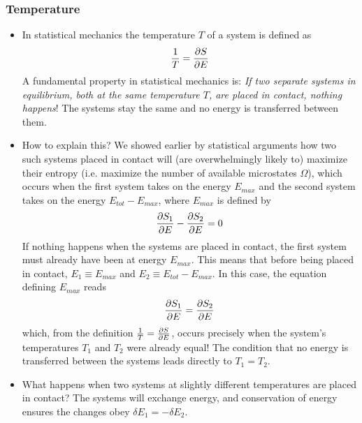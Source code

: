 \documentclass[11pt, a4paper]{article}
\begin{document}
\subsubsection{Temperature}
\begin{itemize}
	\item In statistical mechanics the temperature $ T $ of a system is defined as
	\begin{equation*}
		\frac{1}{T} = \pdv{S}{E}
	\end{equation*}
	A fundamental property in statistical mechanics is: \textit{If two separate systems in equilibrium, both at the same temperature $ T $, are placed in contact, nothing happens}! The systems stay the same and no energy is transferred between them.
	
	\item How to explain this? We showed earlier by statistical arguments how two such systems placed in contact will (are overwhelmingly likely to) maximize their entropy (i.e. maximize the number of available microstates $ \Omega $), which occurs when the first system takes on the energy $ E_{max} $ and the second system takes on the energy $ E_{tot} - E_{max} $, where $ E_{max} $ is defined by
	\begin{equation*}
		\pdv{S_{1}}{E} (E_{max}) - \pdv{S_{2}}{E} (E_{tot} - E_{max}) = 0
	\end{equation*}
	If nothing happens when the systems are placed in contact, the first system must already have been at energy $ E_{max} $. This means that before being placed in contact, $ E_{1} \equiv E_{max} $ and $ E_{2} \equiv E_{tot} - E_{max} $. In this case, the equation defining $ E_{max} $ reads
	\begin{equation*}
		\pdv{S_{1}}{E} (E_{1}) = \pdv{S_{2}}{E} (E_{2})
	\end{equation*}
	which, from the definition $ \frac{1}{T} = \pdv{S}{E} $, occurs precisely when the system's temperatures $ T_{1} $ and $ T_{2} $ were already equal! The condition that no energy is transferred between the systems leads directly to $ T_{1} = T_{2} $.
	
	\item What happens when two systems at slightly different temperatures are placed in contact? The systems will exchange energy, and conservation of energy ensures the changes obey $ \delta E_{1} = -\delta E_{2} $. 
	

\end{itemize}
\end{document}
